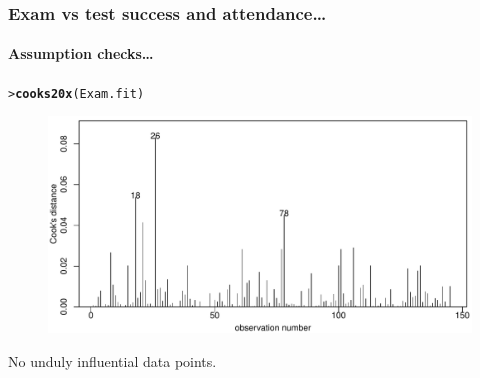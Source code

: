 \documentclass{beamer}\usepackage[]{graphicx}\usepackage[]{xcolor}
\makeatletter
\newcommand{\hlstd}[1]{\textcolor[rgb]{0.345,0.345,0.345}{#1}}%
\newcommand{\hlkwd}[1]{\textcolor[rgb]{0.737,0.353,0.396}{\textbf{#1}}}%
\newenvironment{kframe}{%
 \def\at@end@of@kframe{}%
 \ifinner\ifhmode%
  \def\at@end@of@kframe{\end{minipage}}%
  \begin{minipage}{\columnwidth}%
 \fi\fi%
 \def\FrameCommand##1{\hskip\@totalleftmargin \hskip-\fboxsep
 \colorbox{shadecolor}{##1}\hskip-\fboxsep
     \hskip-\linewidth \hskip-\@totalleftmargin \hskip\columnwidth}%
 \MakeFramed {\advance\hsize-\width
   \@totalleftmargin\z@ \linewidth\hsize
   \@setminipage}}%
 {\par\unskip\endMakeFramed%
 \at@end@of@kframe}
\newenvironment{knitrout}{}{} %
\makeatother
\begin{document}
\begin{frame}
\frametitle{Exam vs test success and attendance\ldots}
\framesubtitle{Assumption checks\ldots}
\begin{knitrout}\scriptsize
{}\color{fgcolor}\begin{kframe}
\begin{alltt}
\hlstd{> }\hlkwd{cooks20x}\hlstd{(Exam.fit)}
\end{alltt}
\end{kframe}
\end{knitrout}



\begin{figure}
  \centering
  \includegraphics[scale = 0.5]{figure/RC-H12-013}
\end{figure}

No unduly influential data points.
\end{frame}
\end{document}
